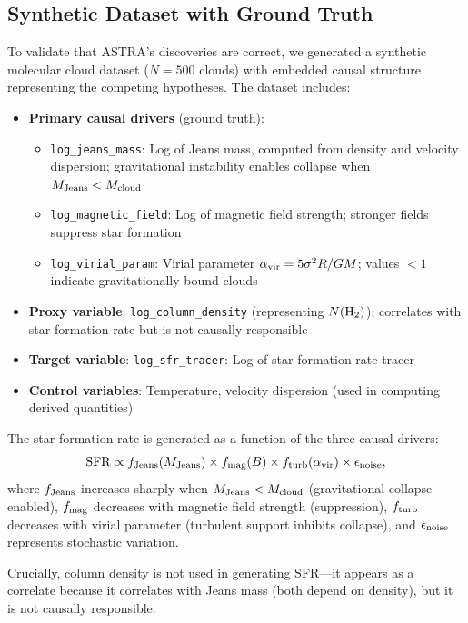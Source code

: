 \documentclass[usenatbib]{rasti}
\begin{document}
\subsection{Synthetic Dataset with Ground Truth}

To validate that ASTRA's discoveries are correct, we generated a synthetic molecular cloud dataset ($N = 500$ clouds) with embedded causal structure representing the competing hypotheses. The dataset includes:

\begin{itemize}
\item \textbf{Primary causal drivers} (ground truth):
  \begin{itemize}
  \item \texttt{log\_jeans\_mass}: Log of Jeans mass, computed from density and velocity dispersion; gravitational instability enables collapse when $M_{\rm Jeans} < M_{\rm cloud}$
  \item \texttt{log\_magnetic\_field}: Log of magnetic field strength; stronger fields suppress star formation
  \item \texttt{log\_virial\_param}: Virial parameter $\alpha_{\rm vir} = 5\sigma^2R/GM$; values $<1$ indicate gravitationally bound clouds
  \end{itemize}
\item \textbf{Proxy variable}: \texttt{log\_column\_density} (representing $N({\rm H_2})$); correlates with star formation rate but is not causally responsible
\item \textbf{Target variable}: \texttt{log\_sfr\_tracer}: Log of star formation rate tracer
\item \textbf{Control variables}: Temperature, velocity dispersion (used in computing derived quantities)
\end{itemize}

The star formation rate is generated as a function of the three causal drivers:
\begin{equation}
{\rm SFR} \propto f_{\rm Jeans}(M_{\rm Jeans}) \times f_{\rm mag}(B) \times f_{\rm turb}(\alpha_{\rm vir}) \times \epsilon_{\rm noise},
\end{equation}
where $f_{\rm Jeans}$ increases sharply when $M_{\rm Jeans} < M_{\rm cloud}$ (gravitational collapse enabled), $f_{\rm mag}$ decreases with magnetic field strength (suppression), $f_{\rm turb}$ decreases with virial parameter (turbulent support inhibits collapse), and $\epsilon_{\rm noise}$ represents stochastic variation.

Crucially, column density is not used in generating SFR---it appears as a correlate because it correlates with Jeans mass (both depend on density), but it is not causally responsible.
\end{document}
